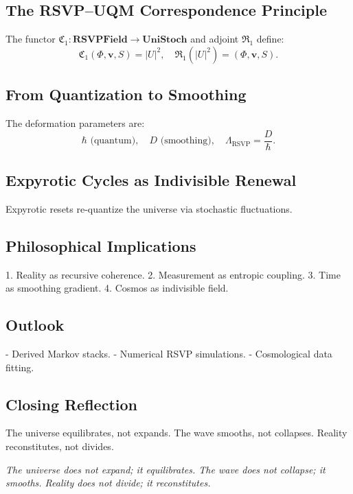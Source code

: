 \documentclass[12pt]{article}
\begin{document}
\subsection{The RSVP–UQM Correspondence Principle}

The functor \(\mathfrak{C}_1: \mathbf{RSVPField} \to \mathbf{UniStoch}\) and adjoint \(\mathfrak{R}_1\) define:
\[
\mathfrak{C}_1(\Phi, \mathbf{v}, S) = |U|^2, \quad \mathfrak{R}_1(|U|^2) = (\Phi, \mathbf{v}, S).
\]

\subsection{From Quantization to Smoothing}

The deformation parameters are:
\[
\hbar \text{ (quantum)}, \quad D \text{ (smoothing)}, \quad \Lambda_{\mathrm{RSVP}} = \frac{D}{\hbar}.
\]

\subsection{Expyrotic Cycles as Indivisible Renewal}

Expyrotic resets re-quantize the universe via stochastic fluctuations.

\subsection{Philosophical Implications}

1. Reality as recursive coherence.
2. Measurement as entropic coupling.
3. Time as smoothing gradient.
4. Cosmos as indivisible field.

\subsection{Outlook}

- Derived Markov stacks.
- Numerical RSVP simulations.
- Cosmological data fitting.

\subsection{Closing Reflection}

The universe equilibrates, not expands. The wave smooths, not collapses. Reality reconstitutes, not divides.

\begin{center}
\emph{The universe does not expand; it equilibrates. The wave does not collapse; it smooths. Reality does not divide; it reconstitutes.}
\end{center}
\end{document}
